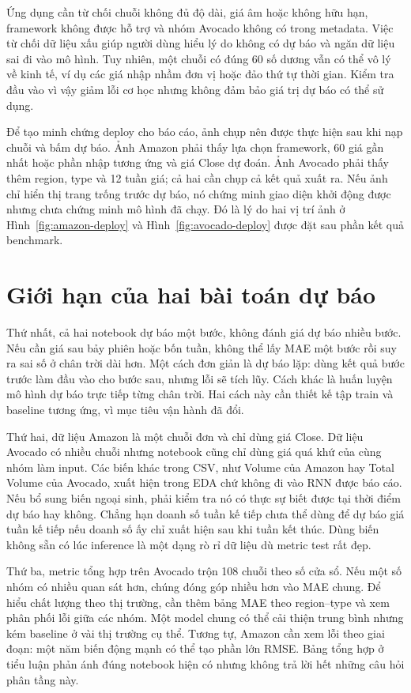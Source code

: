 \documentclass[12pt,a4paper]{report}
\begin{document}
Ứng dụng cần từ chối chuỗi không đủ độ dài, giá âm hoặc không hữu hạn, framework không được hỗ trợ và nhóm Avocado không có trong metadata. Việc từ chối dữ liệu xấu giúp người dùng hiểu lý do không có dự báo và ngăn dữ liệu sai đi vào mô hình. Tuy nhiên, một chuỗi có đúng 60 số dương vẫn có thể vô lý về kinh tế, ví dụ các giá nhập nhầm đơn vị hoặc đảo thứ tự thời gian. Kiểm tra đầu vào vì vậy giảm lỗi cơ học nhưng không đảm bảo giá trị dự báo có thể sử dụng.

Để tạo minh chứng deploy cho báo cáo, ảnh chụp nên được thực hiện sau khi nạp chuỗi và bấm dự báo. Ảnh Amazon phải thấy lựa chọn framework, 60 giá gần nhất hoặc phần nhập tương ứng và giá Close dự đoán. Ảnh Avocado phải thấy thêm region, type và 12 tuần giá; cả hai cần chụp cả kết quả xuất ra. Nếu ảnh chỉ hiển thị trang trống trước dự báo, nó chứng minh giao diện khởi động được nhưng chưa chứng minh mô hình đã chạy. Đó là lý do hai vị trí ảnh ở Hình~\ref{fig:amazon-deploy} và Hình~\ref{fig:avocado-deploy} được đặt sau phần kết quả benchmark.

\section{Giới hạn của hai bài toán dự báo}
Thứ nhất, cả hai notebook dự báo một bước, không đánh giá dự báo nhiều bước. Nếu cần giá sau bảy phiên hoặc bốn tuần, không thể lấy MAE một bước rồi suy ra sai số ở chân trời dài hơn. Một cách đơn giản là dự báo lặp: dùng kết quả bước trước làm đầu vào cho bước sau, nhưng lỗi sẽ tích lũy. Cách khác là huấn luyện mô hình dự báo trực tiếp từng chân trời. Hai cách này cần thiết kế tập train và baseline tương ứng, vì mục tiêu vận hành đã đổi.

Thứ hai, dữ liệu Amazon là một chuỗi đơn và chỉ dùng giá Close. Dữ liệu Avocado có nhiều chuỗi nhưng notebook cũng chỉ dùng giá quá khứ của cùng nhóm làm input. Các biến khác trong CSV, như Volume của Amazon hay Total Volume của Avocado, xuất hiện trong EDA chứ không đi vào RNN được báo cáo. Nếu bổ sung biến ngoại sinh, phải kiểm tra nó có thực sự biết được tại thời điểm dự báo hay không. Chẳng hạn doanh số tuần kế tiếp chưa thể dùng để dự báo giá tuần kế tiếp nếu doanh số ấy chỉ xuất hiện sau khi tuần kết thúc. Dùng biến không sẵn có lúc inference là một dạng rò rỉ dữ liệu dù metric test rất đẹp.

Thứ ba, metric tổng hợp trên Avocado trộn 108 chuỗi theo số cửa sổ. Nếu một số nhóm có nhiều quan sát hơn, chúng đóng góp nhiều hơn vào MAE chung. Để hiểu chất lượng theo thị trường, cần thêm bảng MAE theo region--type và xem phân phối lỗi giữa các nhóm. Một model chung có thể cải thiện trung bình nhưng kém baseline ở vài thị trường cụ thể. Tương tự, Amazon cần xem lỗi theo giai đoạn: một năm biến động mạnh có thể tạo phần lớn RMSE. Bảng tổng hợp ở tiểu luận phản ánh đúng notebook hiện có nhưng không trả lời hết những câu hỏi phân tầng này.
\end{document}
